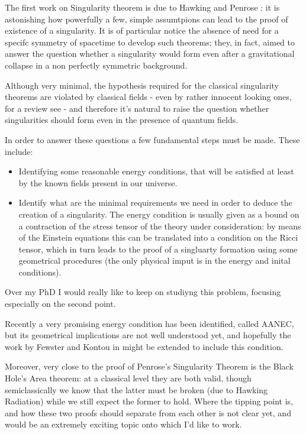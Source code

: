 \documentclass[12pt, a4paper]{article}
\begin{document}
The first work on Singularity theorem is due to Hawking \cite{hawking1966occurrence} and Penrose \cite{penrose1965gravitational}: it is astonishing how powerfully a few, simple assumtpions can lead to the proof of existence of a singularity.
It is of particular notice the absence of need for a specifc symmetry of spacetime to develop such theorems; they, in fact, aimed to answer the question whether a singularity would form even after a gravitational collapse in a non perfectly symmetric background. 

Although very minimal, the hypothesis required for the classical singularity theorems are violated by classical fields - even by rather innocent looking ones, for a review see \cite{kontou2020energy} - and therefore it's natural to raise the question whether singularities should form even in the presence of quantum fields.

In order to answer these questions a few fundamental steps must be made. These include:
\begin{itemize}
	\item Identifying some reasonable energy conditions, that will be satisfied at least by the known fields present in our universe.
	\item Identify what are the minimal requirements we need in order to deduce the creation of a singularity. 
	The energy condition is usually given as a bound on a contraction of the stress tensor of the theory under consideration: by means of the Einstein equations this can be translated into a condition on the Ricci tensor, which in turn leads to the proof of a singluarty formation using some geometrical procedures (the only physical imput is in the energy and inital conditions).
\end{itemize}

Over my PhD I would really like to keep on studiyng this problem, focusing especially on the second point. 

Recently a very promising energy condition has been identified, called AANEC, but its geometrical implications are not well understood yet, and hopefully the work by Fewster and Kontou in \cite{fewster2020new} might be extended to include this condition.

Moreover, very close to the proof of Penrose's Singularity Theorem is the Black Hole's Area theorem: at a classical level they are both valid, though semiclassically we know that the latter must be broken (due to Hawking Radiation) while we still expect the former to hold. Where the tipping point is, and how these two proofs should separate from each other is not clear yet, and would be an extremely exciting topic onto which I'd like to work.
\end{document}
